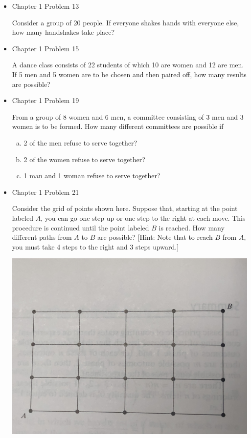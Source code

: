\documentclass[11pt]{article}
\begin{document}
\begin{itemize}
    \item
    Chapter 1 Problem  13
    
    Consider a group of 20 people. If everyone shakes hands with everyone else, how many handshakes take place?

    \item
    Chapter 1 Problem  15
    
    A dance class consists of 22 students of which 10 are women and 12 are men. If 5 men and 5 women are to be chosen and then paired off, how many results are possible?

    \item
    Chapter 1 Problem  19
    
    From a group of 8 women and 6 men, a committee consisting of 3 men and 3 women is to be formed. How many different committees are possible if
    
    \begin{enumerate}[(a)]
    \item 2 of the men refuse to serve together?
    \item 2 of the women refuse to serve together?
    \item 1 man and 1 woman refuse to serve together?
    \end{enumerate}

    \item
    Chapter 1 Problem  21
    
    Consider the grid of points shown here. Suppose that, starting at the point labeled $A$, you can go one step up or one step to the right at each move. This procedure is continued until the point labeled $B$ is reached. How many different paths from $A$ to $B$ are possible? [Hint: Note that to reach $B$ from $A$, you must take 4 steps to the right and 3 steps upward.]
    
   \begin{center}
   \includegraphics[scale=0.05]{Q21}
   \end{center}
   

\end{itemize}
\end{document}
